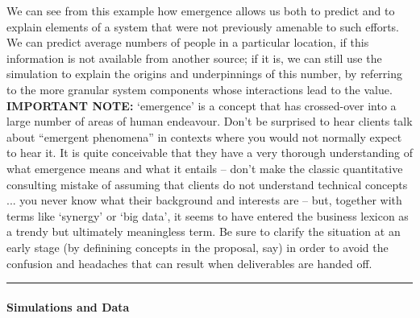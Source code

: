 We can see from this example how emergence allows us both to predict and to explain elements of a system that were not previously amenable to such efforts. We can predict average numbers of people in a particular location, if this information is not available from another source; if it is, we can still use the simulation to explain the origins and underpinnings of this number, by referring to the more granular system components whose interactions lead to the value.
\newl \textbf{IMPORTANT NOTE:} `emergence' is a concept that has crossed-over into a large number of areas of human endeavour. Don't be surprised to hear clients talk about ``emergent phenomena'' in contexts where you would not normally expect to hear it. It is quite conceivable that they have a very thorough understanding of what emergence means and what it entails -- don't make  the classic quantitative consulting mistake of assuming that clients do not understand technical concepts ... you never know what their background and interests are -- but, together with terms like `synergy' or `big data', it seems to have entered the business lexicon as a trendy but ultimately meaningless term. Be sure to clarify the situation at an early stage (by definining concepts in the proposal, say) in order to avoid the confusion and headaches that can result when deliverables are handed off. 
\begin{center}\rule{0.5\linewidth}{.4pt}\end{center}
\paragraph{Simulations and Data}

